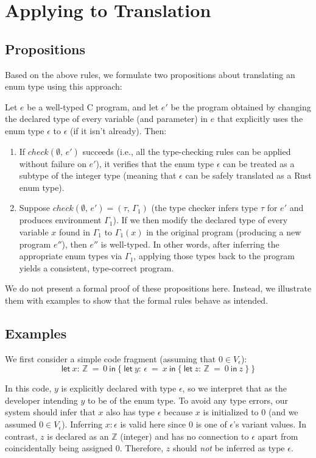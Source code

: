 \documentclass[10pt,conference]{IEEEtran}
\newcommand{\Z}{\ensuremath{\mathbb{Z}}}
\newcommand{\lett}[4]{\ensuremath{\mathsf{let}\ #1\mathsf{:}\,#2\ \mathsf{=}\ #3\ \mathsf{in}\ #4}}
\newcommand{\checktype}[4]{\ensuremath{{check}(#1,\,#2)=(#3,\,#4)}}
\begin{document}
\section{Applying to Translation}

\subsection{Propositions}

Based on the above rules, we formulate two propositions about translating an enum type using this approach:

Let $e$ be a well-typed C program, and let $e'$ be the program obtained by changing the declared type of every variable (and parameter) in $e$ that explicitly uses the enum type $\epsilon$ to $\epsilon$ (if it isn't already). Then:
\begin{enumerate}
    \item If $check(\emptyset,\, e')$ succeeds (i.e., all the type-checking rules can be applied without failure on $e'$), it verifies that the enum type $\epsilon$ can be treated as a subtype of the integer type (meaning that $\epsilon$ can be safely translated as a Rust enum type).
    \item Suppose $\checktype{\emptyset}{e'}{\tau}{\Gamma_1}$ (the type checker infers type $\tau$ for $e'$ and produces environment $\Gamma_1$). If we then modify the declared type of every variable $x$ found in $\Gamma_1$ to $\Gamma_1(x)$ in the original program (producing a new program $e''$), then $e''$ is well-typed. In other words, after inferring the appropriate enum types via $\Gamma_1$, applying those types back to the program yields a consistent, type-correct program.
\end{enumerate}

We do not present a formal proof of these propositions here. Instead, we illustrate them with examples to show that the formal rules behave as intended.

\subsection{Examples}
We first consider a simple code fragment (assuming that $0 \in V_\epsilon$):
\[
\lett{x}{\Z}{0}{
    \{\ \lett{y}{\epsilon}{x}{\{\ 
        \lett{z}{\Z}{0}{z}
    \ \}}\ \}
}\]

In this code, $y$ is explicitly declared with type $\epsilon$, so we interpret that as the developer intending $y$ to be of the enum type. To avoid any type errors, our system should infer that $x$ also has type $\epsilon$ because $x$ is initialized to $0$ (and we assumed $0 \in V_\epsilon$). Inferring $x:\epsilon$ is valid here since $0$ is one of $\epsilon$'s variant values. In contrast, $z$ is declared as an $\mathbb{Z}$ (integer) and has no connection to $\epsilon$ apart from coincidentally being assigned $0$. Therefore, $z$ should \emph{not} be inferred as type $\epsilon$.
\end{document}
